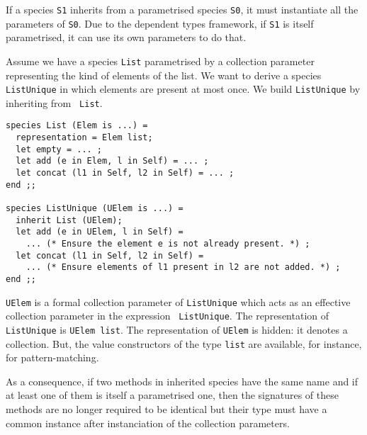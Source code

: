 \smallskip
{}
If a species {\tt S1} inherits from a parametrised species {\tt S0},
it must instantiate all the parameters of {\tt S0}. Due to the
dependent types framework, if {\tt S1} is itself
parametrised, it can use its own parameters to do that. 

Assume we
have a species {\tt List} parametrised by a collection parameter
representing the kind of elements of the list. We want to derive
a species {\tt ListUnique} in which elements are present at most
once. We build {\tt ListUnique} by inheriting from {\tt
  List}.

{\scriptsize
\begin{lstlisting}
species List (Elem is ...) =
  representation = Elem list;
  let empty = ... ;
  let add (e in Elem, l in Self) = ... ;
  let concat (l1 in Self, l2 in Self) = ... ;
end ;;

species ListUnique (UElem is ...) =
  inherit List (UElem);
  let add (e in UElem, l in Self) =
    ... (* Ensure the element e is not already present. *) ;
  let concat (l1 in Self, l2 in Self) =
    ... (* Ensure elements of l1 present in l2 are not added. *) ;
end ;;
\end{lstlisting}
} {\tt UElem} is a formal collection parameter of {\tt ListUnique}
which acts as an effective collection parameter in the expression {\tt
  ListUnique}. The representation of {\tt ListUnique} is {\tt UElem
  list}. The representation of {\tt UElem} is hidden: it denotes a
collection. But, the value constructors of the type {\tt list} are
available, for instance, for pattern-matching.  

As a consequence, if two methods in inherited species have the same
name and if at least one of them is itself a parametrised one, then
the signatures of these methods are no longer required to be identical
but their type must have a common instance after instanciation of the
collection parameters.

